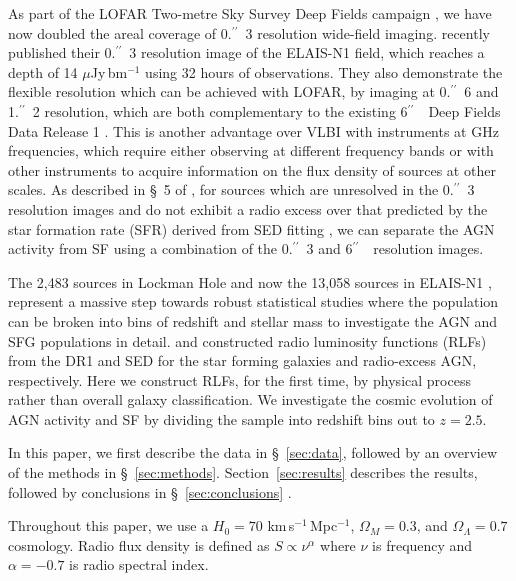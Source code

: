 \documentclass[usenatbib,fleqn,letters]{mnras}
\newcommand{\sarc}{$^{\prime\prime}\!\!$}
\begin{document}
As part of the LOFAR Two-metre Sky Survey Deep Fields campaign \cite[][hereafter, ]{best_lofar_2023}, we have now doubled the areal coverage of 0.\sarc\ 3 resolution wide-field imaging. \cite{de_jong_into_2024} recently published their 0.\sarc\ 3 resolution image of the ELAIS-N1 field, which reaches a depth of 14 $\mu$Jy$\,$bm$^{-1}$ using 32 hours of observations. They also demonstrate the flexible resolution which can be achieved with LOFAR, by imaging at 0.\sarc\ 6 and 1.\sarc\ 2 resolution, which are both complementary to the existing 6\sarc\ \ Deep Fields Data Release 1 \citep[DR1;][]{sabater_lofar_2021,tasse_lofar_2021}. This is another advantage over VLBI with instruments at GHz frequencies, which require either observing at different frequency bands or with other instruments to acquire information on the flux density of sources at other scales. As described in \S~5 of , for sources which are unresolved in the 0.\sarc\ 3 resolution images and do not exhibit a radio excess over that predicted by the star formation rate (SFR) derived from SED fitting , we can separate the AGN activity from SF using a combination of the 0.\sarc\ 3 and 6\sarc\ \ resolution images. 


The 2,483 sources in Lockman Hole \citep{sweijen_deep_2022} and now the 13,058 sources in ELAIS-N1 \citep{de_jong_into_2024}, represent a massive step towards robust statistical studies where the population can be broken into bins of redshift and stellar mass to investigate the AGN and SFG populations in detail. \cite{cochrane_lofar_2023} and \cite{kondapally_cosmic_2022} constructed radio luminosity functions (RLFs) from the DR1 and SED  for the star forming galaxies and radio-excess AGN, respectively. Here we construct RLFs, for the first time, by physical process rather than overall galaxy classification. %
We investigate the cosmic evolution of AGN activity and SF by dividing the sample into redshift bins out to $z = 2.5$. 

In this paper, we first describe the data in \S~\ref{sec:data}, followed by an overview of the methods in \S~\ref{sec:methods}. Section~\ref{sec:results} describes the results, followed by 
conclusions in 
\S~\ref{sec:conclusions}
.

Throughout this paper, we use a $H_0 = 70$ km$\,$s$^{-1}\,$Mpc$^{-1}$, $\Omega_M = 0.3$, and $\Omega_{\Lambda}= 0.7$ cosmology. Radio flux density is defined as $S\propto \nu^{\alpha}$ where $\nu$ is frequency and $\alpha = -0.7$ is radio spectral index. 
\end{document}
